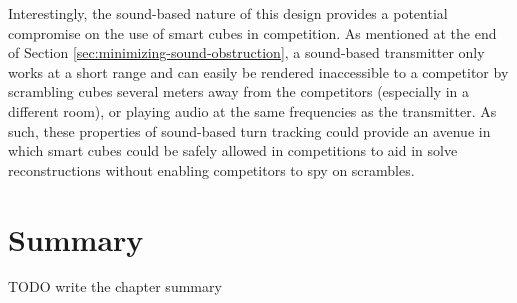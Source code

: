 Interestingly, the sound-based nature of this design provides a
potential compromise on the use of smart cubes in competition. As
mentioned at the end of Section \ref{sec:minimizing-sound-obstruction},
a sound-based transmitter only works at a short range and can easily be
rendered inaccessible to a competitor by scrambling cubes several
meters away from the competitors (especially in a different room), or
playing audio at the same frequencies as the transmitter. As such,
these properties of sound-based turn tracking could provide an avenue
in which smart cubes could be safely allowed in competitions to aid in
solve reconstructions without enabling competitors to spy on scrambles.

\section{Summary}
TODO write the chapter summary

